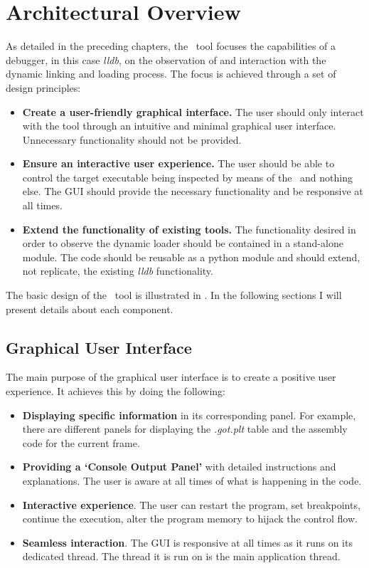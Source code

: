 \chapter{Architectural Overview}
\label{chapter:arch-overview}

As detailed in the preceding chapters, the \project\ tool focuses the capabilities of a debugger, in this case \textit{lldb}, on the observation of and interaction with the dynamic linking and loading process. The focus is achieved through a set of design principles:

\begin{itemize}
\item \textbf{Create a user-friendly graphical interface.} The user should only interact with the tool through an intuitive and minimal graphical user interface. Unnecessary functionality should not be provided.
\item \textbf{Ensure an interactive user experience.} The user should be able to control the target executable being inspected by means of the \gui\ and nothing else. The GUI should provide the necessary functionality and be responsive at all times.
\item \textbf{Extend the functionality of existing tools.} The functionality desired in order to observe the dynamic loader should be contained in a stand-alone module. The code should be reusable as a python module and should extend, not replicate, the existing \textit{lldb} functionality.
\end{itemize}

The basic design of the \project\ tool is illustrated in . In the following sections I will present details about each component.

\section{Graphical User Interface}
\label{sec:gui-arch}

The main purpose of the graphical user interface is to create a positive user experience. It achieves this by doing the following:

\begin{itemize}
\item \textbf{Displaying specific information} in its corresponding panel. For example, there are different panels for displaying the \textit{.got.plt} table and the assembly code for the current frame.
\item \textbf{Providing a ‘Console Output Panel’}  with detailed instructions and explanations. The user is aware at all times of what is happening in the code.
\item \textbf{Interactive experience}. The user can restart the program, set breakpoints, continue the execution, alter the program memory to hijack the control flow.
\item \textbf{Seamless interaction}. The GUI is responsive at all times as it runs on its dedicated thread. The thread it is run on is the main application thread.
\end{itemize}

